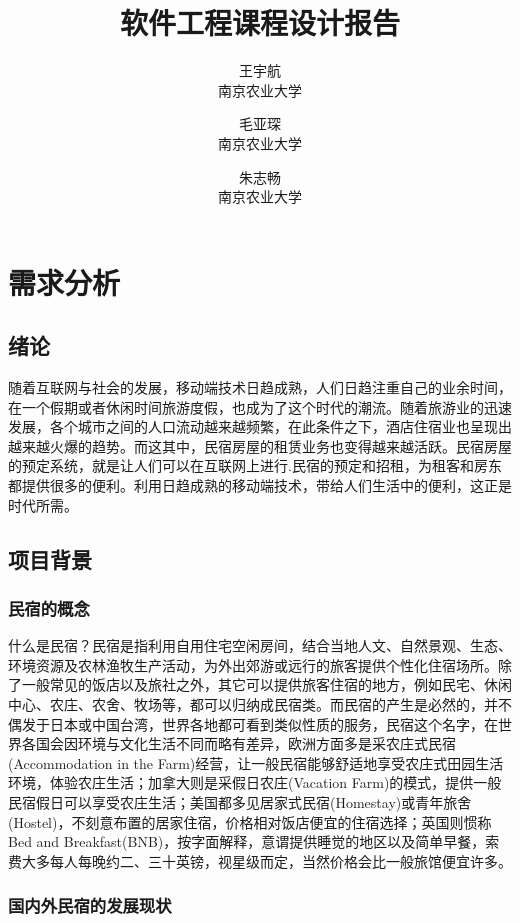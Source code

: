 \documentclass[lang=cn,11pt,a4paper,cite=authoryear]{elegantpaper}
\title{软件工程课程设计报告}
\author{王宇航 \\ 南京农业大学 \and 毛亚琛 \\ 南京农业大学 \and 朱志畅 \\ 南京农业大学}
\date{\zhtoday}
\begin{document}
\maketitle

\section{需求分析}

\subsection{绪论}

随着互联网与社会的发展，移动端技术日趋成熟，人们日趋注重自己的业余时间，在一个假期或者休闲时间旅游度假，也成为了这个时代的潮流。随着旅游业的迅速发展，各个城市之间的人口流动越来越频繁，在此条件之下，酒店住宿业也呈现出越来越火爆的趋势。而这其中，民宿房屋的租赁业务也变得越来越活跃。民宿房屋的预定系统，就是让人们可以在互联网上进行.民宿的预定和招租，为租客和房东都提供很多的便利。利用日趋成熟的移动端技术，带给人们生活中的便利，这正是时代所需。

\subsection{项目背景}

\subsubsection{民宿的概念}

什么是民宿？民宿是指利用自用住宅空闲房间，结合当地人文、自然景观、生态、环境资源及农林渔牧生产活动，为外出郊游或远行的旅客提供个性化住宿场所。除了一般常见的饭店以及旅社之外，其它可以提供旅客住宿的地方，例如民宅、休闲中心、农庄、农舍、牧场等，都可以归纳成民宿类。而民宿的产生是必然的，并不偶发于日本或中国台湾，世界各地都可看到类似性质的服务，民宿这个名字，在世界各国会因环境与文化生活不同而略有差异，欧洲方面多是采农庄式民宿(Accommodation in the Farm)经营，让一般民宿能够舒适地享受农庄式田园生活环境，体验农庄生活；加拿大则是采假日农庄(Vacation Farm)的模式，提供一般民宿假日可以享受农庄生活；美国都多见居家式民宿(Homestay)或青年旅舍(Hostel)，不刻意布置的居家住宿，价格相对饭店便宜的住宿选择；英国则惯称Bed and Breakfast(BNB)，按字面解释，意谓提供睡觉的地区以及简单早餐，索费大多每人每晚约二、三十英镑，视星级而定，当然价格会比一般旅馆便宜许多。

\subsubsection{国内外民宿的发展现状}
\end{document}
